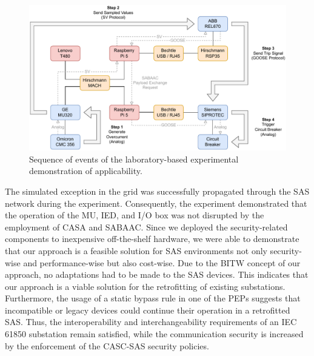 \begin{figure}
    \centering
    \includegraphics[width=1.0\linewidth]{figures/lab_evaluation_steps.drawio.pdf}
    \caption{Sequence of events of the laboratory-based experimental demonstration of applicability.}
    \label{fig:lab_steps}
\end{figure}

The simulated exception in the grid was successfully propagated through the SAS network during the experiment.
Consequently, the experiment demonstrated that the operation of the MU, IED, and I/O box was not disrupted by the employment of CASA and SABAAC.
Since we deployed the security-related components to inexpensive off-the-shelf hardware, we were able to demonstrate that our approach is a feasible solution for SAS environments not only security-wise and performance-wise but also cost-wise.
Due to the BITW concept of our approach, no adaptations had to be made to the SAS devices.
This indicates that our approach is a viable solution for the retrofitting of existing substations.
Furthermore, the usage of a static bypass rule in one of the PEPs suggests that incompatible or legacy devices could continue their operation in a retrofitted SAS.
Thus, the interoperability and interchangeability requirements of an IEC 61850 substation remain satisfied, while the communication security is increased by the enforcement of the CASC-SAS security policies.


